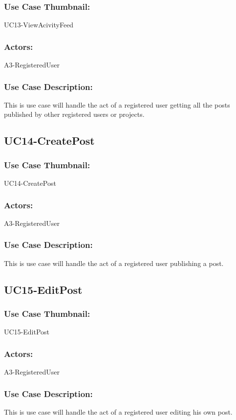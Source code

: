 \documentclass[11pt, openany]{report}
\begin{document}
\subsubsection*{Use Case Thumbnail:}
UC13-ViewAcivityFeed
\subsubsection*{Actors:}
A3-RegisteredUser
\subsubsection*{Use Case Description:}
This is use case will handle the act of a registered user getting all the posts published by other registered users or projects.


\subsection{UC14-CreatePost}
\label{sUC14}
\subsubsection*{Use Case Thumbnail:}
UC14-CreatePost
\subsubsection*{Actors:}
A3-RegisteredUser
\subsubsection*{Use Case Description:}
This is use case will handle the act of a registered user publishing a post.

\subsection{UC15-EditPost}
\label{sUC15}
\subsubsection*{Use Case Thumbnail:}
UC15-EditPost
\subsubsection*{Actors:}
A3-RegisteredUser
\subsubsection*{Use Case Description:}
This is use case will handle the act of a registered user editing his own post. 
\end{document}
